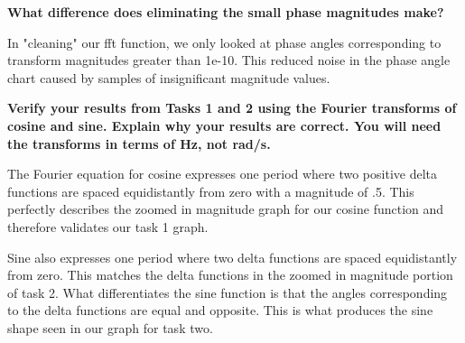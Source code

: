 \documentclass[12pt]{report}
\begin{document}
\textbf{What difference does eliminating the small phase magnitudes make?}

\vspace{.5cm}
In "cleaning" our fft function, we only looked at phase angles corresponding to transform magnitudes greater than 1e-10. This reduced noise in the phase angle chart caused by samples of insignificant magnitude values. \par

\vspace{.5cm}

\textbf{Verify your results from Tasks 1 and 2 using the Fourier transforms of cosine and sine.
Explain why your results are correct. You will need the transforms in terms of Hz, not rad/s.}

The Fourier equation for cosine expresses one period where two positive delta functions are spaced equidistantly from zero with a magnitude of .5. This perfectly describes the zoomed in magnitude graph for our cosine function and therefore validates our task 1 graph.

Sine also expresses one period where two delta functions are spaced equidistantly from zero. This matches the delta functions in the zoomed in magnitude portion of task 2. What differentiates the sine function is that the angles corresponding to the delta functions are equal and opposite. This is what produces the sine shape seen in our graph for task two. 
\end{document}
